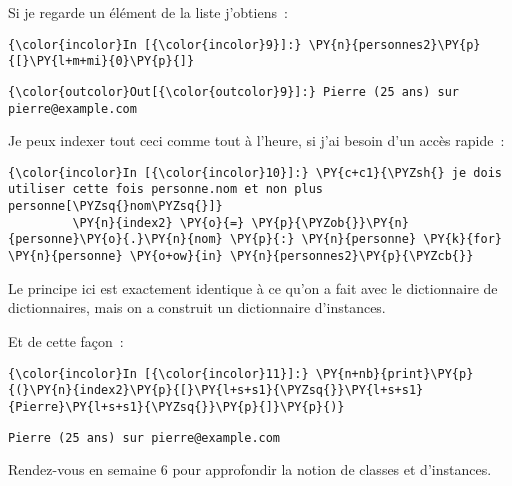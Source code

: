     Si je regarde un élément de la liste j'obtiens~:

    \begin{Verbatim}[commandchars=\\\{\}]
{\color{incolor}In [{\color{incolor}9}]:} \PY{n}{personnes2}\PY{p}{[}\PY{l+m+mi}{0}\PY{p}{]}
\end{Verbatim}


\begin{Verbatim}[commandchars=\\\{\}]
{\color{outcolor}Out[{\color{outcolor}9}]:} Pierre (25 ans) sur pierre@example.com
\end{Verbatim}
            
    Je peux indexer tout ceci comme tout à l'heure, si j'ai besoin d'un
accès rapide~:

    \begin{Verbatim}[commandchars=\\\{\}]
{\color{incolor}In [{\color{incolor}10}]:} \PY{c+c1}{\PYZsh{} je dois utiliser cette fois personne.nom et non plus personne[\PYZsq{}nom\PYZsq{}]}
         \PY{n}{index2} \PY{o}{=} \PY{p}{\PYZob{}}\PY{n}{personne}\PY{o}{.}\PY{n}{nom} \PY{p}{:} \PY{n}{personne} \PY{k}{for} \PY{n}{personne} \PY{o+ow}{in} \PY{n}{personnes2}\PY{p}{\PYZcb{}}
\end{Verbatim}


    Le principe ici est exactement identique à ce qu'on a fait avec le
dictionnaire de dictionnaires, mais on a construit un dictionnaire
d'instances.

Et de cette façon~:

    \begin{Verbatim}[commandchars=\\\{\}]
{\color{incolor}In [{\color{incolor}11}]:} \PY{n+nb}{print}\PY{p}{(}\PY{n}{index2}\PY{p}{[}\PY{l+s+s1}{\PYZsq{}}\PY{l+s+s1}{Pierre}\PY{l+s+s1}{\PYZsq{}}\PY{p}{]}\PY{p}{)}
\end{Verbatim}


    \begin{Verbatim}[commandchars=\\\{\}]
Pierre (25 ans) sur pierre@example.com

    \end{Verbatim}

    Rendez-vous en semaine 6 pour approfondir la notion de classes et
d'instances.


    
    
    
